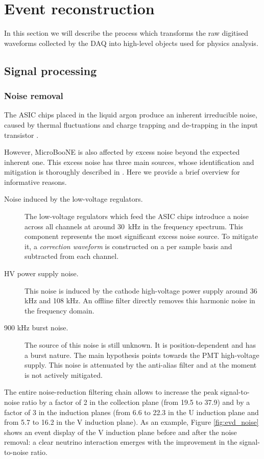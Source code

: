 \chapter{Event reconstruction}\label{sec:eventreco}

\minitoc

In this section we will describe the process which transforms the raw digitised waveforms collected by the DAQ into high-level objects used for physics analysis. 

\section{Signal processing}
\subsection{Noise removal}
The ASIC chips placed in the liquid argon produce an inherent irreducible noise, caused by thermal fluctuations and charge trapping and de-trapping in the input transistor \cite{Acciarri:2017sde}. 

However, MicroBooNE is also affected by excess noise beyond the expected inherent one. This excess noise has three main sources, whose identification and mitigation is thoroughly described in \cite{Acciarri:2017sde}. Here we provide a brief overview for informative reasons.
\begin{description}
\item[Noise induced by the low-voltage regulators.] The low-voltage regulators which feed the ASIC chips introduce a noise across all channels at around 30~kHz in the frequency spectrum. This component represents the most significant excess noise source. To mitigate it, a \emph{correction waveform} is constructed on a per sample basis and subtracted from each channel.
\item[HV power supply noise.] This noise is induced by the cathode high-voltage power supply around 36 kHz and 108 kHz. An offline filter directly removes this harmonic noise in the frequency domain.
\item[900 kHz burst noise.] The source of this noise is still unknown. It is position-dependent and has a burst nature. The main hypothesis points towards the PMT high-voltage supply. This noise is attenuated by the anti-alias filter and at the moment is not actively mitigated.
\end{description}
The entire noise-reduction filtering chain allows to increase the peak signal-to-noise ratio by a factor of 2 in the collection plane (from 19.5 to 37.9) and by a factor of 3 in the induction planes (from 6.6 to 22.3 in the U induction plane and from 5.7 to 16.2 in the V induction plane). As an example, Figure \ref{fig:evd_noise} shows an event display of the V induction plane before and after the noise removal: a clear neutrino interaction emerges with the improvement in the signal-to-noise ratio. 

